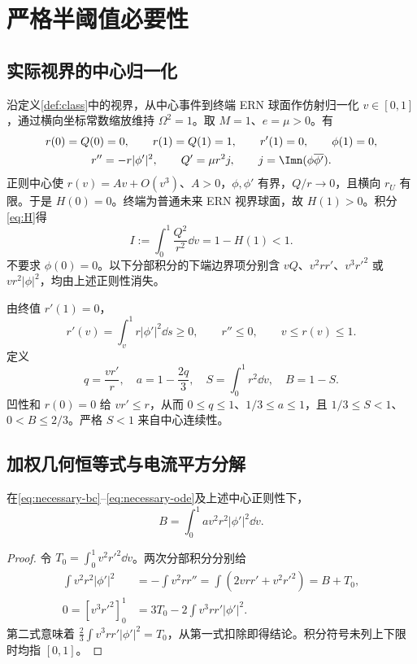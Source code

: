 \section{严格半阈值必要性}\label{sec:necessary}
\subsection{实际视界的中心归一化}
沿定义\ref{def:class}中的视界，从中心事件到终端 ERN 球面作仿射归一化 $v\in[0,1]$，通过横向坐标常数缩放维持 $\Omega^2=1$。取 $M=1$、$e=\mu>0$。有
\begin{gather}\label{eq:necessary-bc}
r(0)=Q(0)=0,\qquad r(1)=Q(1)=1,\qquad r'(1)=0,\qquad\phi(1)=0,\\
r''=-r|\phi'|^2,\qquad Q'=\mu r^2j,\qquad
j=\Imn(\phi\overline{\phi'}).\label{eq:necessary-ode}
\end{gather}
正则中心使 $r(v)=Av+O(v^3)$、$A>0$，$\phi,\phi'$ 有界，$Q/r\to0$，且横向 $r_U$ 有限。于是 $H(0)=0$。终端为普通未来 ERN 视界球面，故 $H(1)>0$。积分\eqref{eq:H}得
\begin{equation}\label{eq:I}
I:=\int_0^1\frac{Q^2}{r^2}\dd v=1-H(1)<1.
\end{equation}
不要求 $\phi(0)=0$。以下分部积分的下端边界项分别含 $vQ$、$v^2rr'$、$v^3r'^2$ 或 $vr^2|\phi|^2$，均由上述正则性消失。

由终值 $r'(1)=0$，
\begin{equation}\label{eq:concave}
r'(v)=\int_v^1 r|\phi'|^2\dd s\ge0,\qquad r''\le0,
\qquad v\le r(v)\le1.
\end{equation}
定义
\begin{equation}\label{eq:qab}
q=\frac{vr'}r,\quad a=1-\frac{2q}3,\quad
S=\int_0^1r^2\dd v,\quad B=1-S.
\end{equation}
凹性和 $r(0)=0$ 给 $vr'\le r$，从而 $0\le q\le1$、$1/3\le a\le1$，且 $1/3\le S<1$、$0<B\le2/3$。严格 $S<1$ 来自中心连续性。

\subsection{加权几何恒等式与电流平方分解}
\begin{lemma}[精确几何能量]\label{lem:energy}
在\eqref{eq:necessary-bc}--\eqref{eq:necessary-ode}及上述中心正则性下，
\begin{equation}\label{eq:energy}
B=\int_0^1 av^2r^2|\phi'|^2\dd v.
\end{equation}
\end{lemma}
\begin{proof}
令 $T_0=\int_0^1v^2r'^2\dd v$。两次分部积分分别给
\begin{align*}
\int v^2r^2|\phi'|^2
&=-\int v^2rr''=\int(2vrr'+v^2r'^2)=B+T_0,\\
0=[v^3r'^2]_0^1&=3T_0-2\int v^3rr'|\phi'|^2.
\end{align*}
第二式意味着 $\frac23\int v^3rr'|\phi'|^2=T_0$，从第一式扣除即得结论。积分符号未列上下限时均指 $[0,1]$。
\end{proof}

